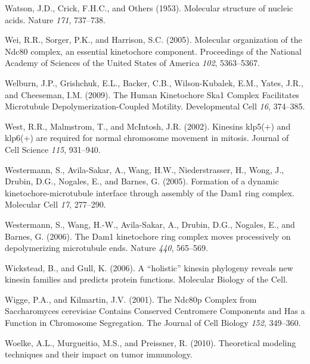 \documentclass[12pt,a4paper,twoside,openright]{book}
\begin{document}
Watson, J.D., Crick, F.H.C., and Others (1953). Molecular structure of
nucleic acids. Nature \emph{171}, 737--738.

Wei, R.R., Sorger, P.K., and Harrison, S.C. (2005). Molecular
organization of the Ndc80 complex, an essential kinetochore component.
Proceedings of the National Academy of Sciences of the United States of
America \emph{102}, 5363--5367.

Welburn, J.P., Grishchuk, E.L., Backer, C.B., Wilson-Kubalek, E.M.,
Yates, J.R., and Cheeseman, I.M. (2009). The Human Kinetochore Ska1
Complex Facilitates Microtubule Depolymerization-Coupled Motility.
Developmental Cell \emph{16}, 374--385.

West, R.R., Malmstrom, T., and McIntosh, J.R. (2002). Kinesins klp5(+)
and klp6(+) are required for normal chromosome movement in mitosis.
Journal of Cell Science \emph{115}, 931--940.

Westermann, S., Avila-Sakar, A., Wang, H.W., Niederstrasser, H., Wong,
J., Drubin, D.G., Nogales, E., and Barnes, G. (2005). Formation of a
dynamic kinetochore-microtubule interface through assembly of the Dam1
ring complex. Molecular Cell \emph{17}, 277--290.

Westermann, S., Wang, H.-W., Avila-Sakar, A., Drubin, D.G., Nogales, E.,
and Barnes, G. (2006). The Dam1 kinetochore ring complex moves
processively on depolymerizing microtubule ends. Nature \emph{440},
565--569.

Wickstead, B., and Gull, K. (2006). A ``holistic'' kinesin phylogeny
reveals new kinesin families and predicts protein functions. Molecular
Biology of the Cell.

Wigge, P.A., and Kilmartin, J.V. (2001). The Ndc80p Complex from
Saccharomyces cerevisiae Contains Conserved Centromere Components and
Has a Function in Chromosome Segregation. The Journal of Cell Biology
\emph{152}, 349--360.

Woelke, A.L., Murgueitio, M.S., and Preissner, R. (2010). Theoretical
modeling techniques and their impact on tumor immunology.
\end{document}
